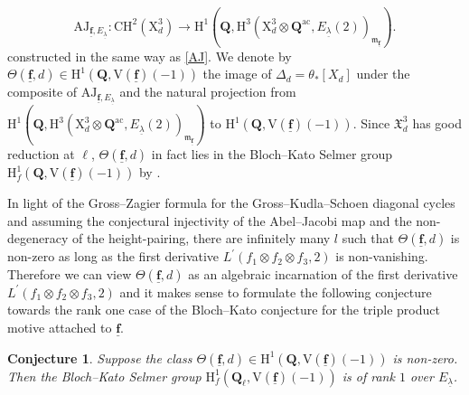 \documentclass[10pt]{amsart}
\numberwithin{equation}{section}
\theoremstyle{plain}
\newtheorem{conjecture}[theorem]{Conjecture}
\numberwithin{equation}{section}
\theoremstyle{definition}
\theoremstyle{remark}
\def\ac{\mathrm{ac}}
\def\frakm{\mathfrak{m}}
\def\Qbar{\QQ^{\ac}}
\def\interX{\mathfrak{X}}
\def\ac{\mathrm{ac}}
\def\undlamb{\underline{\lambda}}
\def\triplef{\underline{\mathbf{f}}}
\def\frakm{\mathfrak{m}}
\def\QQ{\mathbf{Q}}
\def\rmH{\mathrm{H}}
\def\rmX{\mathrm{X}}
\def\rmV{\mathrm{V}}
\begin{document}
\begin{equation}\label{AJ-Q}
\mathrm{AJ}_{\triplef, E_{\undlamb}}: \mathrm{CH}^{2}(\rmX^{3}_{d})\rightarrow \rmH^{1}(\QQ,  \rmH^{3}(\rmX^{3}_{d}\otimes{\Qbar}, E_{\underline{\lambda}}(2))_{\frakm_{\triplef}}).
\end{equation} 
constructed in the same way as \ref{AJ}.
We denote by $\Theta(\triplef, d) \in \rmH^{1}(\QQ,  \rmV(\triplef)(-1))$ the image of $\Delta_{d}=\theta_{*}[X_{d}]$ under the composite of $\mathrm{AJ}_{\triplef, E_{\undlamb}}$ and the natural projection from $\rmH^{1}(\QQ,  \rmH^{3}(\rmX^{3}_{d}\otimes{\QQ^{\ac}}, E_{\underline{\lambda}}(2))_{\frakm_{\triplef}})$ to $\rmH^{1}(\QQ,  \rmV(\triplef)(-1))$.  Since $\interX^{3}_{d}$ has good reduction at $\ell$, $\Theta(\triplef, d)$ in fact lies in the Bloch--Kato Selmer group $\rmH^{1}_{f}(\QQ, \mathrm{V}(\triplef)(-1))$ by \cite[Theorem 3.1]{Nekovar}. 

In light of the Gross--Zagier formula for the Gross--Kudla--Schoen diagonal cycles \cite{YZZ-dia} and assuming the conjectural injectivity of the Abel--Jacobi map and the non-degeneracy of the height-pairing, there are infinitely many $l$ such that $\Theta(\triplef, d)$ is non-zero as long as the first derivative $L^{\prime}(f_{1}\otimes f_{2}\otimes f_{3}, 2)$ is non-vanishing. Therefore we can view $\Theta(\triplef, d)$ as an algebraic incarnation of the first derivative $L^{\prime}(f_{1}\otimes f_{2}\otimes f_{3}, 2)$ and it makes sense to formulate the following conjecture towards the rank one case of the Bloch--Kato conjecture for the triple product motive attached to $\triplef$.

\begin{conjecture}
Suppose the class $\Theta(\triplef, d)\in \rmH^{1}(\QQ,  \rmV(\triplef)(-1))$ is non-zero. Then the Bloch--Kato Selmer group $\rmH^{1}_{f}(\QQ_{\ell}, \mathrm{V}(\triplef)(-1))$ is of rank $1$ over ${E_{\undlamb}}$.
\end{conjecture}
\end{document}
